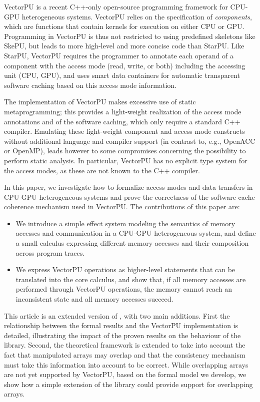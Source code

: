 VectorPU \cite{VectorPU-2017} is a recent C++-only
open-source
programming framework for CPU-GPU heterogeneous systems. 
VectorPU relies on the specification of 
\textit{components}, which are functions that contain kernels for execution
on either CPU or GPU. Programming in VectorPU is thus not restricted 
to using predefined skeletons like SkePU, 
but leads to more high-level and more concise code than StarPU. 
Like StarPU, VectorPU requires the programmer
to annotate each operand of a component
with the access mode (read, write, or both) including the 
accessing unit (CPU, GPU), and uses smart data containers for automatic transparent
software caching based on this access mode information.

The implementation of VectorPU makes excessive use of static metaprogramming; this provides a light-weight realization of the access mode annotations and of the software caching, 
which only require a standard C++ compiler. Emulating these 
light-weight
component and access mode constructs without additional language
and compiler support (in contrast to, e.g., OpenACC or OpenMP), 
leads however to some compromises concerning the possibility to perform static analysis.
In particular, VectorPU has no explicit type system for the
access modes, as these are not known to the C++ compiler.

In this paper, we investigate how to formalize access modes
and data transfers in CPU-GPU heterogeneous systems and prove 
the correctness of the software
cache coherence mechanism used in VectorPU.
The contributions of this paper are:

\begin{itemize}
\item We introduce a simple effect system modeling the semantics of memory
   accesses and communication in a CPU-GPU heterogeneous system,
   and define a small calculus expressing different memory
   accesses and their composition across program traces. 
\item We express VectorPU operations as higher-level statements
    that can be translated into the core calculus,
    and show that, if all memory accesses are performed 
    through VectorPU operations, the memory cannot reach an 
    inconsistent state and all memory accesses succeed.
\end{itemize}

This article is an extended version of \cite{HKL-4PAD2018}, with two main additions. First the relationship between the formal results and the VectorPU implementation is  detailed, illustrating the impact of the proven results on the behaviour of the library. Second, the theoretical framework is extended to take into account the fact that manipulated arrays may overlap and that the consistency mechanism must take this information into account to be correct. While overlapping arrays are not yet supported by VectorPU, based on the formal model we develop, we show how a simple extension of the library could provide support for overlapping arrays.

